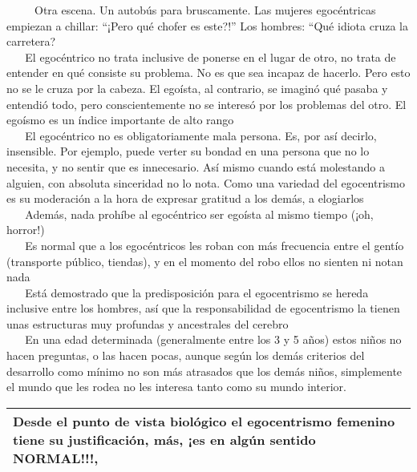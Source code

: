 ~ ~ ~ Otra escena. Un autobús para bruscamente. Las mujeres egocéntricas
empiezan a chillar: ``¡Pero qué chofer es este?!'' Los hombres: ``Qué
idiota cruza la carretera?\\
\hspace*{0.333em} ~ ~ El egocéntrico no trata inclusive de ponerse en el
lugar de otro, no trata de entender en qué consiste su problema. No es
que sea incapaz de hacerlo. Pero esto no se le cruza por la cabeza. El
egoísta, al contrario, se imaginó qué pasaba y entendió todo, pero
conscientemente no se interesó por los problemas del otro. El egoísmo es
un índice importante de alto rango\\
\hspace*{0.333em} ~ ~ El egocéntrico no es obligatoriamente mala
persona. Es, por así decirlo, insensible. Por ejemplo, puede verter su
bondad en una persona que no lo necesita, y no sentir que es
innecesario. Así mismo cuando está molestando a alguien, con absoluta
sinceridad no lo nota. Como una variedad del egocentrismo es su
moderación a la hora de expresar gratitud a los demás, a elogiarlos\\
\hspace*{0.333em} ~ ~ Además, nada prohíbe al egocéntrico ser egoísta al
mismo tiempo (¡oh, horror!)\\
\hspace*{0.333em} ~ ~ Es normal que a los egocéntricos les roban con más
frecuencia entre el gentío (transporte público, tiendas), y en el
momento del robo ellos no sienten ni notan nada\\
\hspace*{0.333em} ~ ~ Está demostrado que la predisposición para el
egocentrismo se hereda inclusive entre los hombres, así que la
responsabilidad de egocentrismo la tienen unas estructuras muy profundas
y ancestrales del cerebro\\
\hspace*{0.333em} ~ ~ En una edad determinada (generalmente entre los 3
y 5 años) estos niños no hacen preguntas, o las hacen pocas, aunque
según los demás criterios del desarrollo como mínimo no son más
atrasados que los demás niños, simplemente el mundo que les rodea no les
interesa tanto como su mundo interior.

\begin{longtable}[]{@{}l@{}}
\toprule
Desde el punto de vista biológico el egocentrismo femenino tiene su
justificación, más, ¡es en algún sentido
\textbf{NORMAL!!!},\tabularnewline
\bottomrule
\end{longtable}

